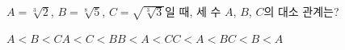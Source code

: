 $A=\sqrt[3]{2}$, $B=\sqrt[8]{5}$, $C=\sqrt{\sqrt[3]{3}}$일 때, 세 수 $A$, $B$, $C$의 대소 관계는?
\begin{choicesii}{$A<B<C$}{$A<C<B$}{$B<A<C$}{$C<A<B$}{$C<B<A$}\end{choicesii}
